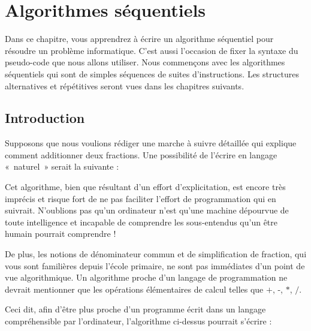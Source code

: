 
\chapter{Algorithmes séquentiels}

	Dans ce chapitre, vous apprendrez à écrire un algorithme séquentiel pour
	résoudre un problème informatique. C'est aussi
	l'occasion de fixer la syntaxe du pseudo-code que nous
	allons utiliser. Nous commençons avec les algorithmes
	séquentiels qui sont de simples séquences de suites
	d'instructions. Les structures alternatives et
	répétitives seront vues dans les chapitres suivants.


	\section{Introduction}

		Supposons que nous voulions rédiger une marche
		à suivre détaillée qui explique comment additionner deux fractions. Une
		possibilité de l’écrire en langage «~naturel~» serait la suivante :

		
		Cet algorithme, bien que résultant d’un effort
		d’explicitation, est encore très imprécis et risque fort de ne pas
		faciliter l’effort de programmation qui en suivrait. N’oublions pas
		qu’un ordinateur n’est qu’une machine dépourvue de toute intelligence
		et incapable de comprendre les sous-entendus qu’un être humain pourrait
		comprendre !

		De plus, les notions de dénominateur commun et
		de simplification de fraction, qui vous sont 
		familières depuis l'école primaire, 
		ne sont pas immédiates d'un point de
		vue algorithmique. Un algorithme proche d'un langage
		de programmation ne devrait mentionner que les opérations élémentaires
		de calcul telles que $+$, -, $*$, $/$.

		Ceci dit, afin d’être plus proche d’un
		programme écrit dans un langage compréhensible par l’ordinateur,
		l’algorithme ci-dessus pourrait s’écrire :


